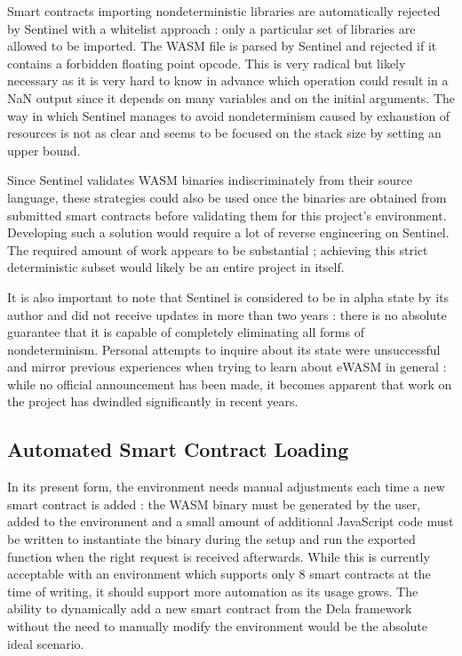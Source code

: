 \documentclass[11pt, a4paper, twoside, openright]{article}
\begin{document}
Smart contracts importing nondeterministic libraries are automatically rejected by Sentinel with a whitelist approach : only a particular set of libraries are allowed to be imported. The WASM file is parsed by Sentinel and rejected if it contains a forbidden floating point opcode. This is very radical but likely necessary as it is very hard to know in advance which operation could result in a NaN output since it depends on many variables and on the initial arguments. The way in which Sentinel manages to avoid nondeterminism caused by exhaustion of resources is not as clear and seems to be focused on the stack size by setting an upper bound.

Since Sentinel validates WASM binaries indiscriminately from their source language, these strategies could also be used once the binaries are obtained from submitted smart contracts before validating them for this project's environment. Developing such a solution would require a lot of reverse engineering on Sentinel. The required amount of work appears to be substantial ; achieving this strict deterministic subset would likely be an entire project in itself. 

It is also important to note that Sentinel is considered to be in alpha state by its author and did not receive updates in more than two years : there is no absolute guarantee that it is capable of completely eliminating all forms of nondeterminism. Personal attempts to inquire about its state were unsuccessful and mirror previous experiences when trying to learn about eWASM in general : while no official announcement has been made, it becomes apparent that work on the project has dwindled significantly in recent years.

\subsection{Automated Smart Contract Loading}

In its present form, the environment needs manual adjustments each time a new smart contract is added : the WASM binary must be generated by the user, added to the environment and a small amount of additional JavaScript code must be written to instantiate the binary during the setup and run the exported function when the right request is received afterwards. While this is currently acceptable with an environment which supports only 8 smart contracts at the time of writing, it should support more automation as its usage grows. The ability to dynamically add a new smart contract from the Dela framework without the need to manually modify the environment would be the absolute ideal scenario.
\end{document}
